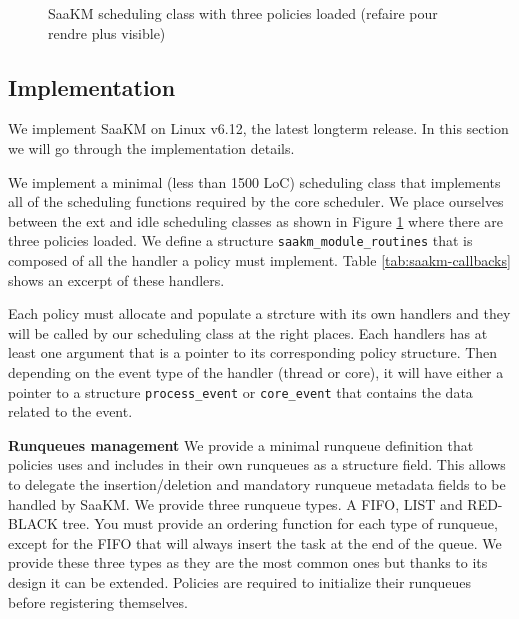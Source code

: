 \begin{figure}[htbp]
        \centering
        
        \caption{SaaKM scheduling class with three policies loaded (refaire pour rendre plus visible)}
        \label{fig:linux-saakm-sched-class}
\end{figure}

\subsection{Implementation}
\par We implement SaaKM on Linux v6.12, the latest longterm release. In this section we will go through the implementation details.

\par We implement a minimal (less than 1500 LoC) scheduling class that implements all of the scheduling functions required by the core scheduler. We place ourselves between the ext and idle scheduling classes as shown in Figure \ref{fig:linux-saakm-sched-class} where there are three policies loaded. We define a structure \texttt{saakm\_module\_routines} that is composed of all the handler a policy must implement. Table \ref{tab:saakm-callbacks} shows an excerpt of these handlers.

\par Each policy must allocate and populate a strcture with its own handlers and they will be called by our scheduling class at the right places. Each handlers has at least one argument that is a pointer to its corresponding policy structure. Then depending on the event type of the handler (thread or core), it will have either a pointer to a structure \texttt{process\_event} or \texttt{core\_event} that contains the data related to the event.

\par \textbf{Runqueues management} We provide a minimal runqueue definition that policies uses and includes in their own runqueues as a structure field. This allows to delegate the insertion/deletion and mandatory runqueue metadata fields to be handled by SaaKM. We provide three runqueue types. A FIFO, LIST and RED-BLACK tree. You must provide an ordering function for each type of runqueue, except for the FIFO that will always insert the task at the end of the queue. We provide these three types as they are the most common ones but thanks to its design it can be extended. Policies are required to initialize their runqueues before registering themselves.\newline 

